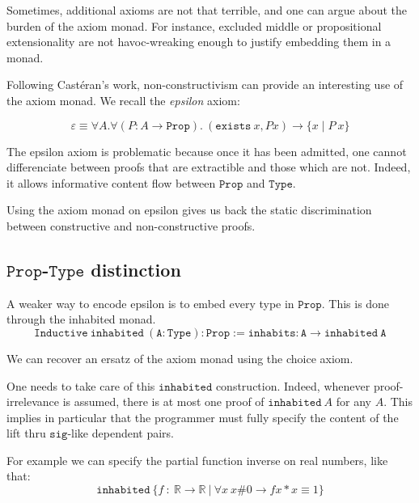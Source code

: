 \documentclass[a4paper,11pt]{article}
\newcommand{\R}{\mathbb{R}}
\theoremstyle{definition}
\theoremstyle{remark}
\begin{document}
Sometimes, additional axioms are not that terrible, and one can argue about the burden of the axiom monad. For instance, excluded middle or propositional extensionality are not havoc-wreaking enough to justify embedding them in a monad.

Following Castéran's work, non-constructivism can provide an interesting use of the axiom monad. We recall the \emph{epsilon} axiom:

$$\varepsilon ≡ \forall A.\forall (P : A\rightarrow  \mathtt{Prop}).\ (\mathtt{exists}\ x, P x) \rightarrow \{x\mid P\  x\}$$

The epsilon axiom is problematic because once it has been admitted, one cannot differenciate between proofs that are extractible and those which are not. Indeed, it allows informative content flow between $\mathtt{Prop}$ and $\mathtt{Type}$.

Using the axiom monad on epsilon gives us back the static discrimination between constructive and non-constructive proofs.

\subsection{$\mathtt{Prop}$-$\mathtt{Type}$ distinction}

A weaker way to encode epsilon is to embed every type in $\mathtt{Prop}$. This is done through the inhabited monad.
$$\mathtt{Inductive\ inhabited\ (A : Type) : Prop :=  inhabits : A \rightarrow inhabited\ A}$$

We can recover an ersatz of the axiom monad using the choice axiom.

One needs to take care of this $\mathtt{inhabited}$ construction. Indeed, whenever proof-irrelevance is assumed, there is at most one proof of $\mathtt{inhabited}\ A$ for any $A$. This implies in particular that the programmer must fully specify the content of the lift thru $\mathtt{sig}$-like dependent pairs.

For example we can specify the partial function inverse on real numbers, like that:
$$\mathtt{inhabited}\ \{f\ :\ \R → \R\ |\ \forall x\ x \# 0 → f x * x ≡ 1\}$$
\end{document}
